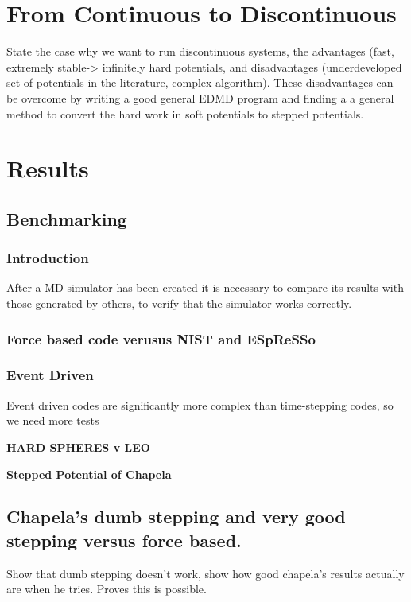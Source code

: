\message{ !name(main.tex)}\documentclass[12pt]{UoAthesis}
\begin{document}
\chapter{From Continuous to Discontinuous}
State the case why we want to run discontinuous systems, the
advantages (fast, extremely stable-> infinitely hard potentials, and
disadvantages (underdeveloped set of potentials in the literature,
complex algorithm). These disadvantages can be overcome by writing a
good general EDMD program and finding a a general method to convert
the hard work in soft potentials to stepped potentials. 


\chapter{Results} 

\section{Benchmarking} 

\subsection{Introduction} 
After a MD simulator has been created it is necessary to compare its
results with those generated by others, to verify that the simulator
works correctly.

\subsection{Force based code verusus NIST and ESpReSSo}

\subsection{Event Driven}
Event driven codes are significantly more complex than time-stepping codes, so we need more tests

{\bf HARD SPHERES v LEO}

{\bf Stepped Potential of Chapela}

\section{Chapela's dumb stepping and very good stepping versus force based. }

Show that dumb stepping doesn't work, show how good chapela's results actually are when he tries. Proves this is possible.
\end{document}
